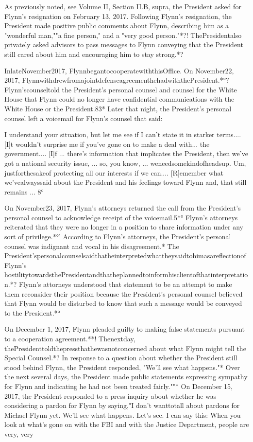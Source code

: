 As previously noted, see Volume II, Section II.B, supra, the President asked for Flynn's resignation on February 13, 2017.
Following Flynn's resignation, the President made positive public comments about Flynn, describing him as a "wonderful man,""a fine person," and a "very good person."*?!
ThePresidentalso privately asked advisors to pass messages to Flynn conveying that the President still cared about him and encouraging him to stay strong.*?

InlateNovember2017, FlynnbegantocooperatewiththisOffice. On November22, 2017, FlynnwithdrewfromajointdefenseagreementhehadwiththePresident.*°?
Flynn'scounseltold the President's personal counsel and counsel for the White House that Flynn could no longer have confidential communications with the White House or the President.83*
Later that night, the President's personal counsel left a voicemail for Flynn's counsel that said:

I understand your situation, but let me see if I can't state it in starker terms....
[I]t wouldn't surprise me if you've gone on to make a deal with... the government....
[I]f ... there's information that implicates the President, then we've got a national security issue, ... so, you know, ... weneedsomekindofheadsup.
Um, justforthesakeof protecting all our interests if we can....
[R]emember what we'vealwayssaid about the President and his feelings toward Flynn and, that still remains ... 8°

On November23, 2017, Flynn's attorneys returned the call from the President's personal counsel to acknowledge receipt of the voicemail.5*°
Flynn's attorneys reiterated that they were no longer in a position to share information under any sort of privilege.*°'
According to Flynn's attorneys, the President's personal counsel was indignant and vocal in his disagreement.*
The President'spersonalcounselsaidthatheinterpretedwhattheysaidtohimasareflectionofFlynn's hostilitytowardsthePresidentandthatheplannedtoinformhisclientofthatinterpretation.*?
Flynn's attorneys understood that statement to be an attempt to make them reconsider their position because the President's personal counsel believed that Flynn would be disturbed to know that such a message would be conveyed to the President.*°

On December 1, 2017, Flynn pleaded guilty to making false statements pursuant to a cooperation agreement.**!
Thenextday, thePresidenttoldthepressthathewasnotconcerned about what Flynn might tell the Special Counsel.*?
In response to a question about whether the President still stood behind Flynn, the President responded, "We'll see what happens."*
Over the next several days, the President made public statements expressing sympathy for Flynn and indicating he had not been treated fairly.""*
On December 15, 2017, the President responded to a press inquiry about whether he was considering a pardon for Flynn by saying,"I don't wanttotall about pardons for Michael Flynn yet.
We'll see what happens.
Let's see.
I can say this: When you look at what's gone on with the FBI and with the Justice Department, people are very, very

